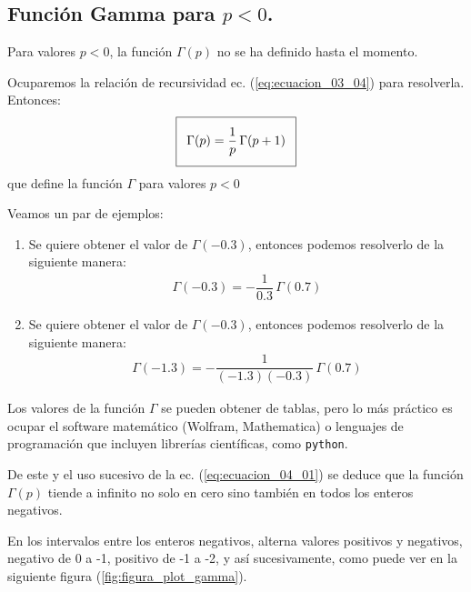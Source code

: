 \subsection{Función Gamma para \texorpdfstring{$p < 0$}{p < 0}.}

Para valores $p < 0$, la función $\Gamma (p)$ no se ha definido hasta el momento.
\par
Ocuparemos la relación de recursividad ec. (\ref{eq:ecuacion_03_04}) para resolverla. Entonces:
\begin{align}\addtolength{\fboxsep}{5pt}\boxed{
\Gamma (p) = \dfrac{1}{p} \, \Gamma (p + 1)}
\label{eq:ecuacion_04_01}
\end{align}
que define la función $\Gamma$ para valores $p < 0$
\par
Veamos un par de ejemplos: 
\begin{enumerate}
\item  Se quiere obtener el valor de $\Gamma (-0.3)$, entonces podemos resolverlo de la siguiente manera:
\begin{align*}
\Gamma (-0.3) = - \dfrac{1}{0.3} \, \Gamma (0.7)
\end{align*}
\item  Se quiere obtener el valor de $\Gamma (-0.3)$, entonces podemos resolverlo de la siguiente manera:
\begin{align*}
\Gamma (-1.3) = - \dfrac{1}{(-1.3)(-0.3)} \, \Gamma (0.7)
\end{align*}
\end{enumerate}
Los valores de la función $\Gamma$ se pueden obtener de tablas, pero lo más práctico es ocupar el software matemático (Wolfram, Mathematica) o lenguajes de programación que incluyen librerías científicas, como \texttt{python}.
\par
De este y el uso sucesivo de la ec. (\ref{eq:ecuacion_04_01}) se deduce que la función $\Gamma (p)$ tiende a infinito no solo en cero sino también en todos los enteros negativos.
\par
En los intervalos entre los enteros negativos, alterna valores positivos y negativos, negativo de 0 a -1, positivo de -1 a -2, y así sucesivamente, como puede ver en la siguiente figura (\ref{fig:figura_plot_gamma}).

